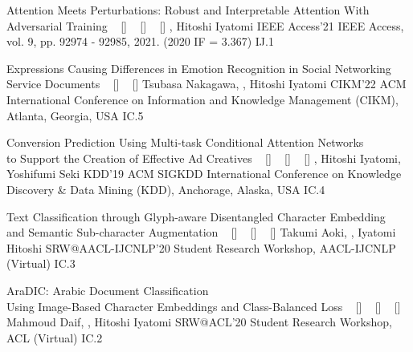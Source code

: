 \begin{publications}
    \publication
    {Attention Meets Perturbations: Robust and Interpretable Attention With Adversarial Training}
    {
    ~ [\href{https://doi.org/10.1109/ACCESS.2021.3093456}{\small{\doiSymbol}}]
    ~ [\href{https://arxiv.org/abs/2009.12064}{\small{\arxivSymbol}}]
    ~ [\href{https://github.com/shunk031/attention-meets-perturbation}{\small{\githubSymbol}}]
    }
    {\underline{}, Hitoshi Iyatomi}
    {IEEE Access'21} {IEEE Access, vol. 9, pp. 92974 - 92985, 2021. (2020 IF = 3.367)} {IJ.1}

    \publication
    {Expressions Causing Differences in Emotion Recognition in Social Networking Service Documents}
    {
    ~ [\href{https://doi.org/10.1145/3511808.3557599}{\small{\doiSymbol}}]
    ~ [\href{https://arxiv.org/abs/2208.14244}{\small{\arxivSymbol}}]
    }
    {Tsubasa Nakagawa, \underline{}, Hitoshi Iyatomi}
    {CIKM'22} {ACM International Conference on Information and Knowledge Management (CIKM), Atlanta, Georgia, USA} {IC.5}

    \publication
    {Conversion Prediction Using Multi-task Conditional Attention Networks \\ to Support the Creation of Effective Ad Creatives}
    {
    ~ [\href{https://doi.org/10.1145/3292500.3330789}{\small{\doiSymbol}}]
    ~ [\href{https://arxiv.org/abs/1905.07289}{\small{\arxivSymbol}}]
    ~ [\href{https://github.com/shunk031/Multi-task-Conditional-Attention-Networks}{\small{\githubSymbol}}]
    }
    {\underline{}, Hitoshi Iyatomi, Yoshifumi Seki}
    {KDD'19} {ACM SIGKDD International Conference on Knowledge Discovery \& Data Mining (KDD), Anchorage, Alaska, USA} {IC.4}

    \publication
    {Text Classification through Glyph-aware Disentangled Character Embedding \\ and Semantic Sub-character Augmentation}
    {
    ~ [\href{https://aclanthology.org/2020.aacl-srw.1/}{\small{\linkSymbol}}]
    ~ [\href{https://arxiv.org/abs/2011.04184}{\small{\arxivSymbol}}]
    ~ [\href{https://github.com/IyatomiLab/GDCE-SSA}{\small{\githubSymbol}}]
    }
    {Takumi Aoki, \underline{}, Iyatomi Hitoshi}
    {SRW@AACL-IJCNLP'20} {Student Research Workshop, AACL-IJCNLP (Virtual)} {IC.3}

    \publication
    {AraDIC: Arabic Document Classification \\ Using Image-Based Character Embeddings and Class-Balanced Loss}
    {
    ~ [\href{http://dx.doi.org/10.18653/v1/2020.acl-srw.29}{\small{\doiSymbol}}]
    ~ [\href{https://arxiv.org/abs/2006.11586}{\small{\arxivSymbol}}]
    ~ [\href{https://github.com/IyatomiLab/GDCE-SSA}{\small{\githubSymbol}}]
    }
    {Mahmoud Daif, \underline{}, Hitoshi Iyatomi}
    {SRW@ACL'20} {Student Research Workshop, ACL (Virtual)} {IC.2}


\end{publications}
